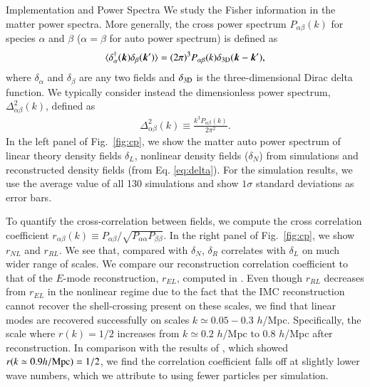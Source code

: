 \begin{section}{Implementation and Power Spectra}
 We study the Fisher information in the matter power
 spectra. More generally,
 the cross power spectrum $P_{\alpha\beta}(k)$ for species $\alpha$ and $\beta$
 ($\alpha=\beta$ for auto power spectrum) is defined as
 \begin{align}
   \langle \delta_\alpha^\dagger(\bm{k})\delta_\beta(\bm{k}') \rangle =
   (2\pi)^3 P_{\alpha\beta}(k) \delta_{\rm {3D}}(\bm{k}-\bm{k}'),
 \end{align}
 where $\delta_{\alpha}$ and $\delta_{\beta}$ are any two fields and
 $\delta_{\rm{3D}}$ is the three-dimensional Dirac delta function. We typically consider instead
 the dimensionless power spectrum, $\Delta_{\alpha\beta}^2(k)$, defined as
 \begin{align}
   \Delta_{\alpha\beta}^2(k) \equiv \frac{k^3 P_{\alpha\beta}(k)}{2\pi ^2}.
 \end{align}
 In the left panel of Fig.~\ref{fig:cp}, we show the matter auto power
 spectrum of linear theory density fields $\delta_L$, nonlinear density
 fields ($\delta_N$) from simulations and reconstructed density fields
 (from Eq. \ref{eq:delta}).  For the simulation
 results, we use the average value of all 130 simulations and show
 $1\sigma$ standard deviations as error bars.  

 To quantify the cross-correlation
 between fields, we compute the cross correlation coefficient
 $r_{\alpha\beta}(k)\equiv P_{\alpha\beta}/\sqrt{P_{\alpha\alpha}P_{\beta\beta}}$.  In the right panel of
 Fig.~\ref{fig:cp}, we show $r_{NL}$ and $r_{RL}$.  We see that, compared with $\delta_N$,
 $\delta_R$ correlates with $\delta_L$ on much wider range of scales.
 We compare our reconstruction correlation coefficient to that of the $E$-mode 
 reconstruction, $r_{EL}$, 
 computed in \citealt{bib:Yu2016}.
 Even though $r_{RL}$ decreases from $r_{EL}$ in the nonlinear regime due to the fact that the IMC reconstruction 
 cannot recover the shell-crossing present on these scales, we find that linear
 modes are recovered successfully on scales $k\simeq 0.05 - 0.3$ $h$/Mpc.
 Specifically, the scale where $r(k)=1/2$ increases from $k\simeq 0.2$ $h$/Mpc to
 $0.8$ $h$/Mpc after reconstruction.  In comparison with the results of \citet{bib:ZhuH2016},
 which showed $r(k\simeq0.9 h/\rm{Mpc})=1/2$, we find the correlation coefficient falls off at slightly lower
 wave numbers, which we attribute to using fewer particles per simulation.


\end{section}
